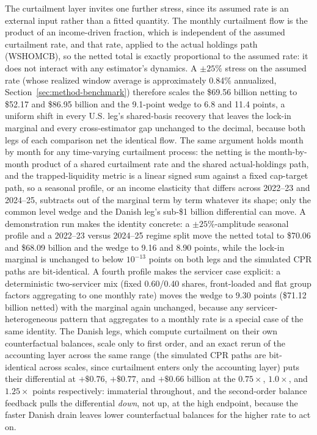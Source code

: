 \documentclass[12pt]{article}
\begin{document}
The curtailment layer invites one further stress, since its assumed rate is an external input rather than a fitted quantity. The monthly curtailment flow is the product of an income-driven fraction, which is independent of the assumed curtailment rate, and that rate, applied to the actual holdings path (WSHOMCB), so the netted total is exactly proportional to the assumed rate: it does not interact with any estimator's dynamics. A $\pm 25\%$ stress on the assumed rate (whose realized window average is approximately 0.84\% annualized, Section~\ref{sec:method-benchmark}) therefore scales the \$69.56 billion netting to \$52.17 and \$86.95 billion and the 9.1-point wedge to 6.8 and 11.4 points, a uniform shift in every U.S. leg's shared-basis recovery that leaves the lock-in marginal and every cross-estimator gap unchanged to the decimal, because both legs of each comparison net the identical flow. The same argument holds month by month for any time-varying curtailment process: the netting is the month-by-month product of a shared curtailment rate and the shared actual-holdings path, and the trapped-liquidity metric is a linear signed sum against a fixed cap-target path, so a seasonal profile, or an income elasticity that differs across 2022--23 and 2024--25, subtracts out of the marginal term by term whatever its shape; only the common level wedge and the Danish leg's sub-\$1 billion differential can move. A demonstration run makes the identity concrete: a $\pm 25\%$-amplitude seasonal profile and a 2022--23 versus 2024--25 regime split move the netted total to \$70.06 and \$68.09 billion and the wedge to 9.16 and 8.90 points, while the lock-in marginal is unchanged to below $10^{-13}$ points on both legs and the simulated CPR paths are bit-identical. A fourth profile makes the servicer case explicit: a deterministic two-servicer mix (fixed 0.60/0.40 shares, front-loaded and flat group factors aggregating to one monthly rate) moves the wedge to 9.30 points (\$71.12 billion netted) with the marginal again unchanged, because any servicer-heterogeneous pattern that aggregates to a monthly rate is a special case of the same identity. The Danish legs, which compute curtailment on their own counterfactual balances, scale only to first order, and an exact rerun of the accounting layer across the same range (the simulated CPR paths are bit-identical across scales, since curtailment enters only the accounting layer) puts their differential at $+\$0.76$, $+\$0.77$, and $+\$0.66$ billion at the $0.75\times$, $1.0\times$, and $1.25\times$ points respectively: immaterial throughout, and the second-order balance feedback pulls the differential \emph{down}, not up, at the high endpoint, because the faster Danish drain leaves lower counterfactual balances for the higher rate to act on.
\end{document}
